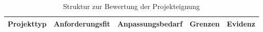 \begin{table}[H]
  \centering
  \footnotesize
  \renewcommand{\arraystretch}{1.2}
  \caption{Struktur zur Bewertung der Projekteignung}
  \label{tab:project-suitability}
  \begin{tabularx}{\textwidth}{@{}p{}p{}p{}p{}>{\raggedright\arraybackslash}X@{}}
    \toprule
    \textbf{Projekttyp} & \textbf{Anforderungsfit} & \textbf{Anpassungsbedarf} & \textbf{Grenzen} & \textbf{Evidenz} \\
    \midrule
    \bottomrule
  \end{tabularx}
\end{table}
